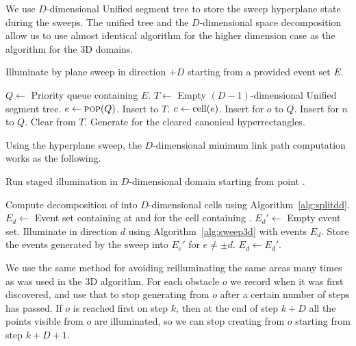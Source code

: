 \documentclass[english,gradu]{tktltiki2018}
\begin{document}
We use $D$-dimensional Unified segment tree to store the sweep hyperplane state during the sweeps.
The unified tree and the $D$-dimensional space decomposition allow us to use almost identical algorithm for the higher dimension case as the algorithm for the 3D domains.

\begin{alg}\label{alg:sweepdd}
Illuminate by plane sweep in direction $+D$ starting from a provided event set $E$.
\begin{algorithmic}
\State $Q\gets$ Priority queue containing $E$.
\State $T\gets$ Empty $(D-1)$-dimensional Unified segment tree.
	\State $e\gets\textsc{pop}(Q)$.
		\State Insert  to $T$.
			\State $c\gets\text{cell}(e)$.
				\State Insert \obsE for $o$ to $Q$.
			\EndFor
				\State Insert \cellE for $n$ to $Q$.
			\EndFor
		\EndIf
		\State Clear  from $T$.
		\State Generate \addEs for the cleared canonical hyperrectangles.
	\EndIf
\EndWhile
\end{algorithmic}
\end{alg}

Using the hyperplane sweep, the $D$-dimensional minimum link path computation works as the following.

\begin{alg}\label{alg:minlinkdd}
Run staged illumination in $D$-dimensional domain \fspace starting from point \spt.
\begin{algorithmic}
\State Compute decomposition of \fspace into $D$-dimensional cells using Algorithm~\ref{alg:splitdd}.
	\State $E_d\gets$ Event set containing \addE at \spt and \cellE for the cell containing \spt.
\EndFor
{}
		\State $E_d'\gets$ Empty event set.
	\EndFor
		\State Illuminate in direction $d$ using Algorithm~\ref{alg:sweep3d} with events $E_d$.
		\State Store the events generated by the sweep into $E_e'$ for $e\neq\pm d$.
	\EndFor
		\State $E_d\gets E_d'$.
	\EndFor
\EndWhile
\end{algorithmic}
\end{alg}

We use the same method for avoiding reilluminating the same areas many times as was used in the 3D algorithm.
For each obstacle $o$ we record when it was first discovered, and use that to stop generating \addEs from $o$ after a certain number of steps has passed.
If $o$ is reached first on step $k$, then at the end of step $k+D$ all the points visible from $o$ are illuminated, so we can stop creating \addEs from $o$ starting from step $k+D+1$.
\end{document}
